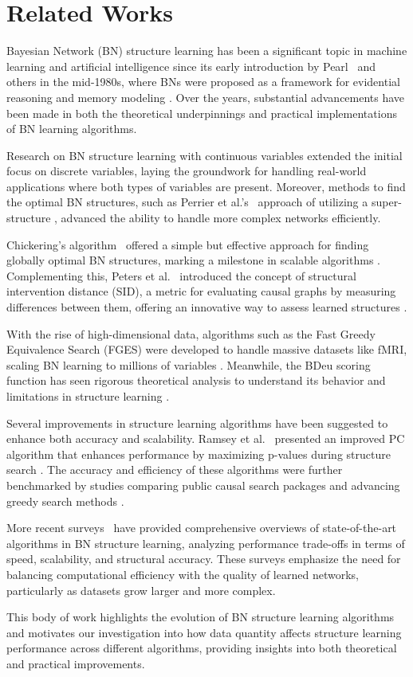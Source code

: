 \section{Related Works}
Bayesian Network (BN) structure learning has been a significant topic in machine learning and artificial intelligence since its early introduction by Pearl~\cite{pearl1985bayesian} and others in the mid-1980s, where BNs were proposed as a framework for evidential reasoning and memory modeling . Over the years, substantial advancements have been made in both the theoretical underpinnings and practical implementations of BN learning algorithms.

Research on BN structure learning with continuous variables extended the initial focus on discrete variables, laying the groundwork for handling real-world applications where both types of variables are present. Moreover, methods to find the optimal BN structures, such as Perrier et al.'s~\cite{perrier2008finding} approach of utilizing a super-structure , advanced the ability to handle more complex networks efficiently.

Chickering's algorithm~\cite{silander2012simple} offered a simple but effective approach for finding globally optimal BN structures, marking a milestone in scalable algorithms . Complementing this, Peters et al.~\cite{peters2015structural} introduced the concept of structural intervention distance (SID), a metric for evaluating causal graphs by measuring differences between them, offering an innovative way to assess learned structures .

With the rise of high-dimensional data, algorithms such as the Fast Greedy Equivalence Search (FGES) were developed to handle massive datasets like fMRI, scaling BN learning to millions of variables . Meanwhile, the BDeu scoring function has seen rigorous theoretical analysis to understand its behavior and limitations in structure learning .

Several improvements in structure learning algorithms have been suggested to enhance both accuracy and scalability. Ramsey et al.~\cite{ramsey2016improving} presented an improved PC algorithm that enhances performance by maximizing p-values during structure search . The accuracy and efficiency of these algorithms were further benchmarked by studies comparing public causal search packages and advancing greedy search methods .

More recent surveys~\cite{scanagatta2019survey, kitson2023survey} have provided comprehensive overviews of state-of-the-art algorithms in BN structure learning, analyzing performance trade-offs in terms of speed, scalability, and structural accuracy. These surveys emphasize the need for balancing computational efficiency with the quality of learned networks, particularly as datasets grow larger and more complex.

This body of work highlights the evolution of BN structure learning algorithms and motivates our investigation into how data quantity affects structure learning performance across different algorithms, providing insights into both theoretical and practical improvements.